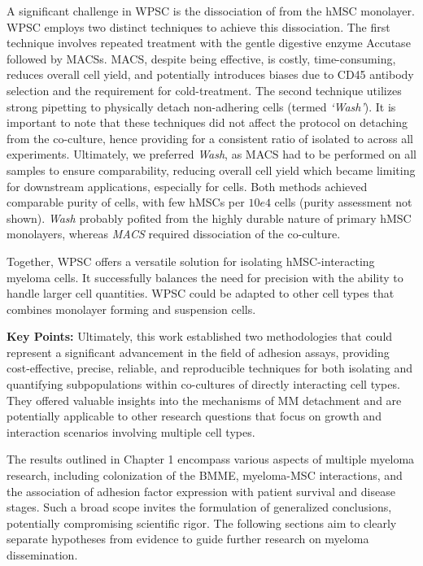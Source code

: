 A significant challenge in \ac{WPSC} is the dissociation of \MAina from the hMSC
monolayer. WPSC employs two distinct techniques to achieve this dissociation.
The first technique involves repeated treatment with the gentle digestive enzyme
Accutase followed by \acp{MACS}. \ac{MACS}, despite being effective, is costly,
time-consuming, reduces overall cell yield, and potentially introduces biases
due to CD45 antibody selection and the requirement for cold-treatment. The
second technique utilizes strong pipetting to physically detach non-adhering
cells (termed \emph{`Wash'}). It is important to note that these techniques did
not affect the protocol on detaching \nMAina from the co-culture, hence
providing for a consistent ratio of isolated \MAina to \nMAina across all
experiments. Ultimately, we preferred \emph{Wash}, as \ac{MACS} had to be performed
on all samples to ensure comparability, reducing overall cell yield which became
limiting for downstream applications, especially for \nMAina cells. Both methods
achieved comparable purity of \MAina cells, with few hMSCs per $10e4$
\MAina cells (purity assessment not shown). \emph{Wash} probably pofited from
the highly durable nature of primary hMSC monolayers, whereas \emph{MACS}
required dissociation of the co-culture.

Together, \ac{WPSC} offers a versatile solution for isolating hMSC-interacting
myeloma cells. It successfully balances the need for precision with the ability
to handle larger cell quantities. \ac{WPSC} could be adapted to other cell types
that combines monolayer forming and suspension cells.



\textbf{Key Points:} Ultimately, this work established two methodologies
that could represent a significant advancement in the field of adhesion assays,
providing cost-effective, precise, reliable, and reproducible techniques for
both isolating and quantifying subpopulations within co-cultures of directly
interacting cell types. They offered valuable insights into the mechanisms of MM
detachment and are potentially applicable to other research questions that focus
on growth and interaction scenarios involving multiple cell types.








%
\label{sec:discussion_framework}%
The results outlined in Chapter 1 encompass various aspects of multiple myeloma
research, including colonization of the \ac{BMME}, myeloma-\ac{MSC}
interactions, and the association of adhesion factor expression with patient
survival and disease stages. Such a broad scope invites the formulation of
generalized conclusions, potentially compromising scientific rigor. The
following sections aim to clearly separate hypotheses from evidence to guide
further research on myeloma dissemination.

